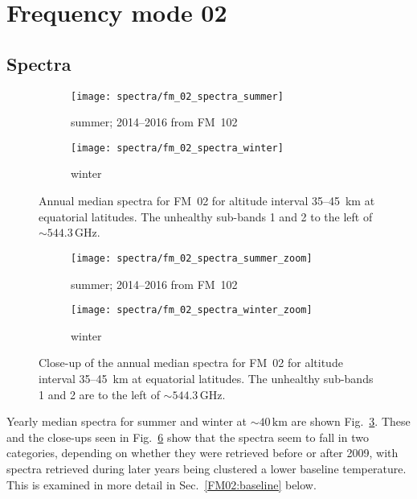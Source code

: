 \section{Frequency mode 02}
\label{FM02}

\subsection{Spectra}
\label{FM02:spectra}

\begin{figure}[ht]
    \centering
    \begin{subfigure}[b]{0.9545\textwidth}
        \texttt{[image: spectra/fm\_02\_spectra\_summer]}
        \caption{summer; 2014--2016 from FM~102}\label{fig:spectra:02:summer}
    \end{subfigure}
    \begin{subfigure}[b]{0.9545\textwidth}
        \texttt{[image: spectra/fm\_02\_spectra\_winter]}
        \caption{winter}\label{fig:spectra:02:winter}
    \end{subfigure}
    \caption{Annual median spectra for FM~02 for altitude interval 35--45~km at
        equatorial latitudes. The unhealthy sub-bands 1 and 2 to the left of
        $\sim544.3\,\mathrm{GHz}$.
        }\label{fig:spectra:02}
\end{figure}

\begin{figure}[ht]
    \centering
    \begin{subfigure}[b]{0.9545\textwidth}
        \texttt{[image: spectra/fm\_02\_spectra\_summer\_zoom]}
        \caption{summer; 2014--2016 from
            FM~102}\label{fig:spectra:02:summer:closeup}
    \end{subfigure}
    \begin{subfigure}[b]{0.9545\textwidth}
        \texttt{[image: spectra/fm\_02\_spectra\_winter\_zoom]}
        \caption{winter}\label{fig:spectra:02:winter:closeup}
    \end{subfigure}
    \caption{Close-up of the annual median spectra for FM~02 for altitude
        interval 35--45~km at equatorial latitudes.  The unhealthy sub-bands
        1 and 2 are to the left of $\sim544.3\,\mathrm{GHz}$.
        }\label{fig:spectra:02:closeup}
\end{figure}

\noindent
Yearly median spectra for summer and winter at $\sim40\,\mathrm{km}$ are shown
Fig.~\ref{fig:spectra:02}.  These and the close-ups seen in
Fig.~\ref{fig:spectra:02:closeup} show that the spectra seem to fall in two
categories, depending on whether they were retrieved before or after 2009, with
spectra retrieved during later years being clustered a lower baseline
temperature.  This is examined in more detail in Sec.~\ref{FM02:baseline}
below.


